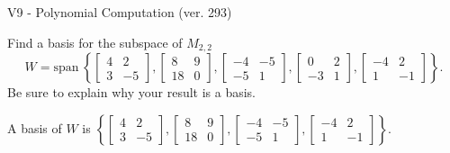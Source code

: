 \begin{exercise}
  \begin{exerciseTitle}V9 - Polynomial Computation (ver. 293)\end{exerciseTitle}
  \begin{exerciseStatement}
    Find a basis for the subspace of \(M_{2,2}\) 
\[W=\mathrm{span}\ \left\{\left[\begin{array}{cc}
4 & 2 \\
3 & -5
\end{array}\right] , \left[\begin{array}{cc}
8 & 9 \\
18 & 0
\end{array}\right] , \left[\begin{array}{cc}
-4 & -5 \\
-5 & 1
\end{array}\right] , \left[\begin{array}{cc}
0 & 2 \\
-3 & 1
\end{array}\right] , \left[\begin{array}{cc}
-4 & 2 \\
1 & -1
\end{array}\right]\right\}.\]
 Be sure to explain why your result is a basis.


  \end{exerciseStatement}
  \begin{exerciseAnswer}
   A basis of \(W\) is  \(\left\{\left[\begin{array}{cc}
4 & 2 \\
3 & -5
\end{array}\right] , \left[\begin{array}{cc}
8 & 9 \\
18 & 0
\end{array}\right] , \left[\begin{array}{cc}
-4 & -5 \\
-5 & 1
\end{array}\right] , \left[\begin{array}{cc}
-4 & 2 \\
1 & -1
\end{array}\right]\right\}\).
  


  \end{exerciseAnswer}
\end{exercise}